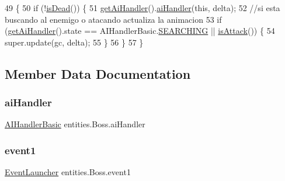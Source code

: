 \begin{DoxyCode}
49                                                      \{
50         \textcolor{keywordflow}{if} (!\mbox{\hyperlink{classentities_1_1_subject_a970082c9d187619c1a27dceec8b3b908}{isDead}}()) \{
51             \mbox{\hyperlink{classentities_1_1_boss_ae66fe60aa4e55353c4c32c945c6453b8}{getAiHandler}}().\mbox{\hyperlink{classentities_1_1_a_i_handler_basic_ae69789cadb89030804ac4ea2d1971e21}{aiHandler}}(\textcolor{keyword}{this}, delta);
52             \textcolor{comment}{//si esta buscando al enemigo o atacando actualiza la animacion}
53             \textcolor{keywordflow}{if} (\mbox{\hyperlink{classentities_1_1_boss_ae66fe60aa4e55353c4c32c945c6453b8}{getAiHandler}}().state == AIHandlerBasic.\mbox{\hyperlink{classentities_1_1_a_i_handler_basic_ac538f98b8bf642899b6cfe493258f381}{SEARCHING}} || 
      \mbox{\hyperlink{classentities_1_1_subject_a6c4ff8d1e50168c7738c8b39cec72631}{isAttack}}()) \{
54                 super.update(gc, delta);
55             \}
56         \}
57     \}
\end{DoxyCode}


\subsection{Member Data Documentation}
\mbox{\label{classentities_1_1_boss_a5b11e193519ab0f145d6c1e672d63714}} 
\subsubsection{\texorpdfstring{ai\+Handler}{aiHandler}}
{\footnotesize\ttfamily \mbox{\hyperlink{classentities_1_1_a_i_handler_basic}{A\+I\+Handler\+Basic}} entities.\+Boss.\+ai\+Handler\hspace{0.3cm}{\ttfamily [private]}}

\mbox{\label{classentities_1_1_boss_a83ec98699f7d7252a29bbf6aa70c0201}} 
\subsubsection{\texorpdfstring{event1}{event1}}
{\footnotesize\ttfamily \mbox{\hyperlink{interfaceentities_1_1_event_launcher}{Event\+Launcher}} entities.\+Boss.\+event1\hspace{0.3cm}{\ttfamily [package]}}

